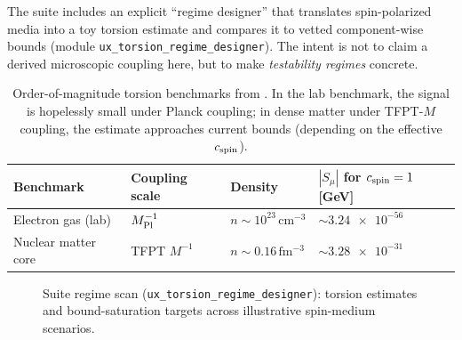 \TFPTTorsionBoundsTable

\begin{tcolorbox}[colback=gray!5, colframe=gray!60,
    title={\textbf{Two concrete torsion test benchmarks (suite; regime designer)}}, fonttitle=\bfseries\small]
The suite includes an explicit ``regime designer'' that translates spin-polarized media into a toy torsion estimate and compares it to vetted component-wise bounds (module \texttt{ux\_torsion\_regime\_designer}). 
The intent is not to claim a derived microscopic coupling here, but to make \emph{testability regimes} concrete.
\end{tcolorbox}

\begin{table}[H]
\centering
\begin{tabular}{@{}llll@{}}
\toprule
\textbf{Benchmark} & \textbf{Coupling scale} & \textbf{Density} & \textbf{$|S_\mu|$ for $c_{\rm spin}=1$ [GeV]} \\
\midrule
Electron gas (lab) & $M_{\rm Pl}^{-1}$ & $n\sim 10^{23}\,\mathrm{cm^{-3}}$ & $\sim \num{3.24e-56}$ \\
Nuclear matter core & TFPT $M^{-1}$ & $n\sim 0.16\,\mathrm{fm^{-3}}$ & $\sim \num{3.28e-31}$ \\
\bottomrule
\end{tabular}
\caption{Order-of-magnitude torsion benchmarks from . In the lab benchmark, the signal is hopelessly small under Planck coupling; in dense matter under TFPT-$M$ coupling, the estimate approaches current bounds (depending on the effective $c_{\rm spin}$).}
\end{table}

\begin{figure}[H]
\centering
{}
\caption{Suite regime scan (\texttt{ux\_torsion\_regime\_designer}): torsion estimates and bound-saturation targets across illustrative spin-medium scenarios.}
\end{figure}


